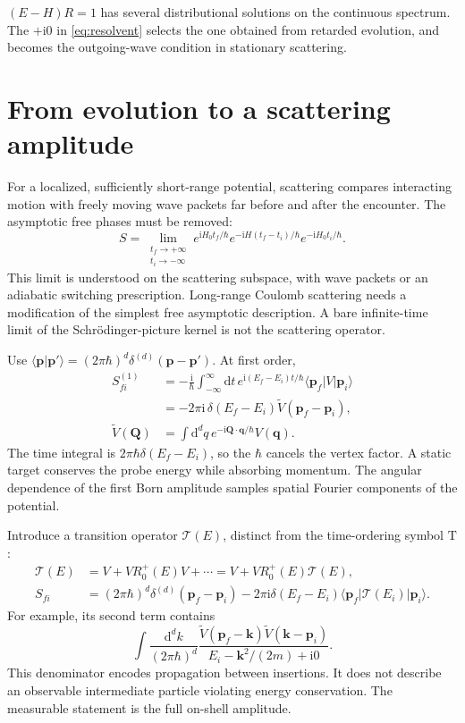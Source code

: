 \documentclass[11pt]{article}
\newcommand{\dd}{\mathrm d}
\newcommand{\ii}{\mathrm i}
\newcommand{\Tord}{\mathrm T}
\newcommand{\module}[1]{\clearpage\section{#1}}
\begin{document}
\begin{keyidea}
\((E-H)R=1\) has several distributional solutions on the continuous
spectrum. The \(+\ii0\) in \eqref{eq:resolvent} selects the one obtained
from retarded evolution, and becomes the outgoing-wave condition in
stationary scattering.
\end{keyidea}

\module{From evolution to a scattering amplitude}
For a localized, sufficiently short-range potential, scattering compares
interacting motion with freely moving wave packets far before and after
the encounter. The asymptotic free phases must be removed:
\begin{equation}
 S=\lim_{\substack{t_f\to+\infty\\t_i\to-\infty}}
 e^{\ii H_0t_f/\hbar}e^{-\ii H(t_f-t_i)/\hbar}
 e^{-\ii H_0t_i/\hbar}.                              \label{eq:smatrix}
\end{equation}
This limit is understood on the scattering subspace, with wave packets
or an adiabatic switching prescription. Long-range Coulomb scattering
needs a modification of the simplest free asymptotic description.
A bare infinite-time limit of the Schr\"odinger-picture kernel is not
the scattering operator.

Use \(\langle\bm p|\bm p'\rangle=(2\pi\hbar)^d
\delta^{(d)}(\bm p-\bm p')\). At first order,
\begin{align}
 S_{fi}^{(1)}&=-\frac{\ii}{\hbar}
 \int_{-\infty}^{\infty}\dd t\,
 e^{\ii(E_f-E_i)t/\hbar}\langle\bm p_f|V|\bm p_i\rangle\\
 &=-2\pi\ii\,\delta(E_f-E_i)\widetilde V(\bm p_f-\bm p_i),\\
 \widetilde V(\bm Q)&=\int\dd^d q\,
 e^{-\ii\bm Q\cdot\bm q/\hbar}V(\bm q).
\end{align}
The time integral is \(2\pi\hbar\delta(E_f-E_i)\), so the
\(\hbar\) cancels the vertex factor. A static target conserves the
probe energy while absorbing momentum. The angular dependence of the
first Born amplitude samples spatial Fourier components of the potential.

Introduce a transition operator \(\mathcal T(E)\), distinct from the
time-ordering symbol \(\Tord\):
\begin{align}
 \mathcal T(E)&=V+VR_0^+(E)V+\cdots=V+VR_0^+(E)\mathcal T(E),\\
 S_{fi}&=(2\pi\hbar)^d\delta^{(d)}(\bm p_f-\bm p_i)
 -2\pi\ii\delta(E_f-E_i)
 \langle\bm p_f|\mathcal T(E_i)|\bm p_i\rangle.       \label{eq:transition}
\end{align}
For example, its second term contains
\begin{equation}
 \int\frac{\dd^d k}{(2\pi\hbar)^d}
 \frac{\widetilde V(\bm p_f-\bm k)\widetilde V(\bm k-\bm p_i)}
 {E_i-\bm k^2/(2m)+\ii0}.
\end{equation}
This denominator encodes propagation between insertions. It does not
describe an observable intermediate particle violating energy
conservation. The measurable statement is the full on-shell amplitude.
\end{document}
